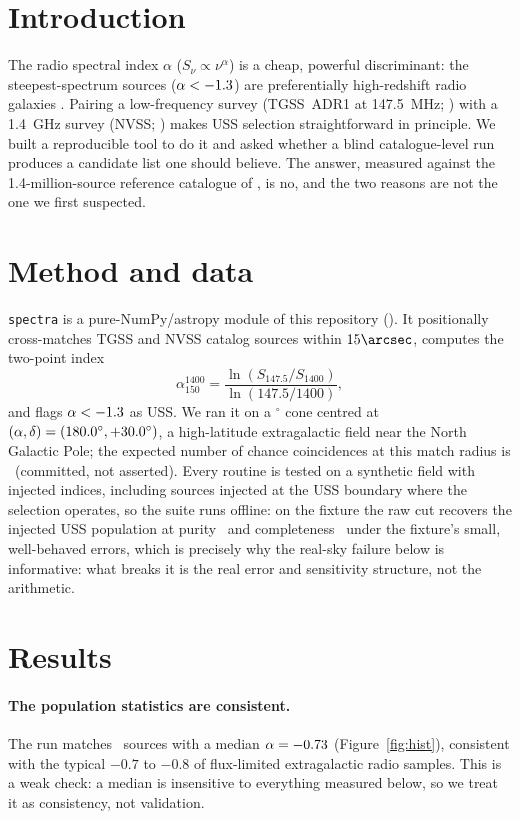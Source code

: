 \documentclass[twocolumn]{aastex631}
\newcommand{\code}[1]{\texttt{#1}}
\begin{document}
\section{Introduction}
The radio spectral index $\alpha$ ($S_\nu\propto\nu^{\alpha}$) is a cheap, powerful discriminant:
the steepest-spectrum sources ($\alpha<-1.3$) are preferentially high-redshift radio galaxies
\citep{debreuck2000, saxena2018}. Pairing a low-frequency survey (TGSS~ADR1 at 147.5~MHz;
\citealt{intema2017}) with a 1.4~GHz survey (NVSS; \citealt{condon1998}) makes USS selection
straightforward in principle. We built a reproducible tool to do it and asked whether a blind
catalogue-level run produces a candidate list one should believe. The answer, measured against the
1.4-million-source reference catalogue of \citet{degasperin2018}, is no, and the two reasons are
not the one we first suspected.

\section{Method and data}
\code{spectra} is a pure-NumPy/astropy module of this repository (\citealt{janskyresearch}). It
positionally cross-matches TGSS and NVSS catalog sources within $15\arcsec$, computes the two-point
index
\begin{equation}
\alpha_{150}^{1400} = \frac{\ln(S_{147.5}/S_{1400})}{\ln(147.5/1400)},
\end{equation}
and flags $\alpha<-1.3$ as USS. We ran it on a \usRadius$^\circ$ cone centred at
$(\alpha,\delta)=(180.0^\circ,+30.0^\circ)$, a high-latitude extragalactic field near
the North Galactic Pole; the expected number of chance coincidences at this match radius is
\usChanceMatches\ (committed, not asserted). Every routine is tested on a synthetic field with
injected indices, including sources injected at the USS boundary where the selection
operates, so the suite runs offline: on the fixture the raw cut recovers the injected USS
population at purity \usSynCutPurity\ and completeness \usSynCutCompleteness\ under the fixture's
small, well-behaved errors, which is precisely why the real-sky failure below is informative: what
breaks it is the real error and sensitivity structure, not the arithmetic.

\section{Results}
\paragraph{The population statistics are consistent.} The run matches \usNmatched\ sources with a
median $\alpha=-0.73$ (Figure~\ref{fig:hist}), consistent with the typical $-0.7$ to
$-0.8$ of flux-limited extragalactic radio samples. This is a weak check: a median is insensitive to everything
measured below, so we treat it as consistency, not validation.
\end{document}
